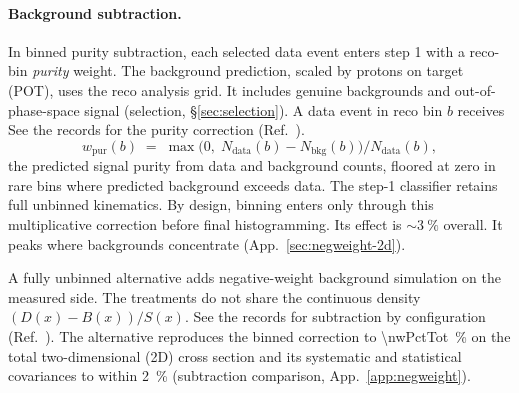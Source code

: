 \paragraph{Background subtraction.} In binned purity subtraction, each selected data event enters step 1 with a reco-bin \emph{purity} weight. The background prediction, scaled by protons on target (POT), uses the reco analysis grid. It includes genuine backgrounds and out-of-phase-space signal (selection, \S\ref{sec:selection}). A data event in reco bin $b$ receives See the records for the purity correction (Ref.~\cite{NoteRecords2026}).
\begin{equation*}
  w_{\mathrm{pur}}(b) \;=\;
  \max\!\bigl(0,\; N_{\mathrm{data}}(b) - N_{\mathrm{bkg}}(b)\bigr)
  \big/ N_{\mathrm{data}}(b),
\end{equation*}
the predicted signal purity from data and background counts, floored at zero in rare bins where predicted background exceeds data. The step-1 classifier retains full unbinned kinematics. By design, binning enters only through this multiplicative correction before final histogramming. Its effect is ${\sim}\SI{3}{\percent}$ overall. It peaks where backgrounds concentrate (App.~\ref{sec:negweight-2d}).

A fully unbinned alternative adds negative-weight background simulation on the measured side. The treatments do not share the continuous density $(D(x)-B(x))/S(x)$. See the records for subtraction by configuration (Ref.~\cite{NoteRecords2026}). The alternative reproduces the binned correction to \SI{\nwPctTot}{\percent} on the total two-dimensional (2D) cross section and its systematic and statistical covariances to within \SI{2}{\percent} (subtraction comparison, App.~\ref{app:negweight}).

